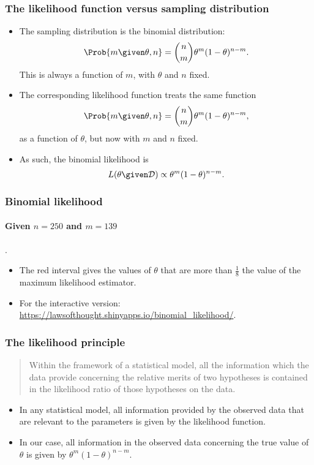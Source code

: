 \documentclass{slides}
\begin{document}
\begin{frame}
	\frametitle{The likelihood function versus sampling distribution}
		\begin{itemize}
			\item The sampling distribution is the binomial distribution:
				\[\Prob{m \given \theta,n} = \binom{n}{m} \theta^m (1-\theta)^{n-m}.\]
				This is always a function of $m$, with $\theta$ and $n$ fixed.
			\item The corresponding likelihood function treats the same function
		\[\Prob{m \given \theta,n} = \binom{n}{m} \theta^m (1-\theta)^{n-m},\] 
				as a function of $\theta$, but now with $m$ and $n$ fixed.
			\item As such, the binomial likelihood is 
				\[L(\theta\given\mathcal{D}) \propto \theta^m (1-\theta)^{n-m}.\]
\end{itemize}
\end{frame}



\begin{frame}
	\frametitle{Binomial likelihood}
	\framesubtitle{Given $n=250$ and $m=139$}.
	
	{\small
	\begin{itemize}
		\item The red interval gives the values of $\theta$ that are more than $\tfrac{1}{8}$ the value of the maximum likelihood estimator.
	\item For the interactive version: \url{https://lawsofthought.shinyapps.io/binomial_likelihood/}.
	\end{itemize}
	}
\end{frame}

\begin{frame}
	\frametitle{The likelihood principle}
\begin{quotation}
	Within the framework of a statistical model, all the information which the data provide concerning the
relative merits of two hypotheses is contained in the likelihood ratio of those
hypotheses on the data.
\end{quotation}
\vspace{-\baselineskip}
\vspace{0.5\baselineskip}
	\begin{itemize}
		\item In any statistical model, all information provided by the observed data that are relevant to the parameters is given by the likelihood function.
		\item In our case, all information in the observed data concerning the true value of $\theta$ is given by $\theta^m (1-\theta)^{n-m}$.
	\end{itemize}
\end{frame}
\end{document}
